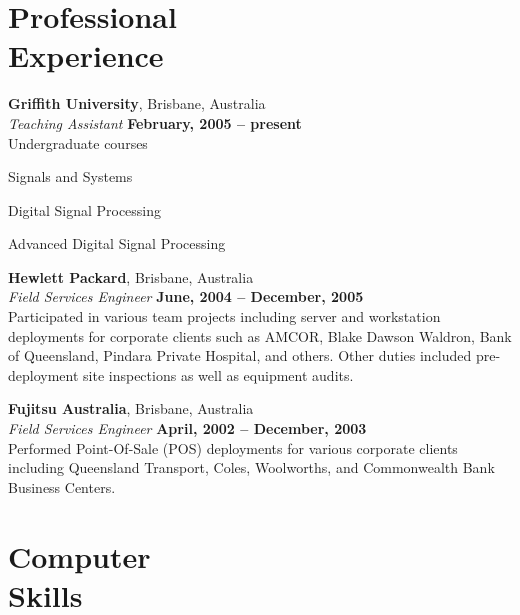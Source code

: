 \documentclass[margin,line]{resume}
\begin{document}
\begin{resume}
    \section{\mysidestyle Professional\\Experience}

    {\bf Griffith University}, Brisbane, Australia \vspace{2mm}\\\vspace{1mm}%
    {\sl Teaching Assistant} \hfill {\bf February, 2005 -- present}\\
    Undergraduate courses
    \begin{list2}
        \vspace*{1mm}
        \item Signals and Systems
        \item Digital Signal Processing
        \item Advanced Digital Signal Processing
    \end{list2}

    {\bf Hewlett Packard}, Brisbane, Australia \vspace{2mm}\\\vspace{1mm}%
    {\sl Field Services Engineer} \hfill {\bf June, 2004 -- December, 2005} \\
    Participated in various team projects including server and workstation deployments 
    for corporate clients such as AMCOR, Blake Dawson Waldron, Bank of Queensland, 
    Pindara Private Hospital, and others. Other duties included pre-deployment site 
    inspections as well as equipment audits.

    {\bf Fujitsu Australia}, Brisbane, Australia \vspace{2mm}\\\vspace{1mm}%
    {\sl Field Services Engineer} \hfill {\bf April, 2002 -- December, 2003}\\
    Performed Point-Of-Sale (POS) deployments for various corporate clients including 
    Queensland Transport, Coles, Woolworths, and Commonwealth Bank Business Centers. 


    \section{\mysidestyle Computer\\Skills} 


\end{resume}
\end{document}
